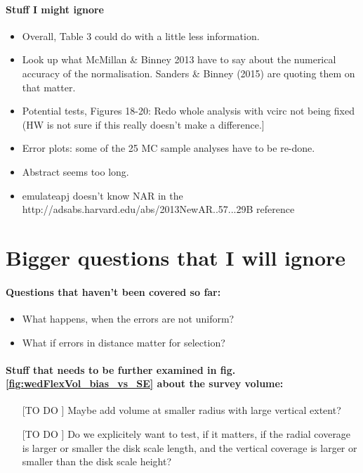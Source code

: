 \paragraph{Stuff I might ignore}
\begin{itemize}
\item Overall, Table 3 could do with a little less information.
\item Look up what McMillan \& Binney 2013 have to say about the numerical accuracy of the normalisation. Sanders \& Binney (2015) are quoting them on that matter.
\item Potential tests, Figures 18-20: Redo whole analysis with vcirc not being fixed (HW is not sure if this really doesn't make a difference.]
\item Error plots: some of the 25 MC sample analyses have to be re-done.
\item Abstract seems too long.
\item emulateapj doesn't know NAR in the http://adsabs.harvard.edu/abs/2013NewAR..57...29B reference
\end{itemize}



\section{Bigger questions that I will ignore}

\paragraph{Questions that haven't been covered so far:}
\begin{itemize}
\item What happens, when the errors are not uniform?
\item What if errors in distance matter for selection?
\end{itemize}

\paragraph{Stuff that needs to be further examined in fig. \ref{fig:wedFlexVol_bias_vs_SE} about the survey volume:}
\begin{itemize}
\item[[TO DO]] Maybe add volume at smaller radius with large vertical extent?
\item[[TO DO]] Do we explicitely want to test, if it matters, if the radial coverage is larger or smaller the disk scale length, and the vertical coverage is larger or smaller than the disk scale height?
\end{itemize}

